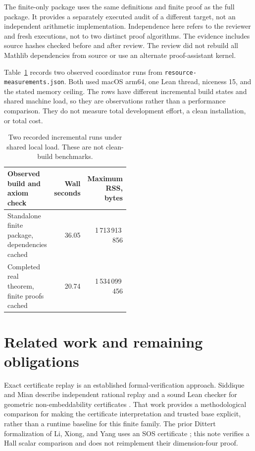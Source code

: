 \documentclass[11pt]{article}
\newcommand{\code}[1]{\texttt{\small #1}}
\begin{document}
The finite-only package uses the same definitions and finite proof as
the full package. It provides a separately executed audit of a different
target, not an independent arithmetic implementation. Independence here
refers to the reviewer and fresh executions, not to two distinct proof
algorithms. The evidence includes source hashes checked before and after
review. The review did not rebuild all Mathlib dependencies from source
or use an alternate proof-assistant kernel.

Table~\ref{tab:resources} records two observed coordinator runs from
\code{resource-measurements.json}. Both used macOS arm64, one Lean
thread, niceness 15, and the stated memory ceiling. The rows have
different incremental build states and shared machine load, so they
are observations rather than a performance comparison. They do not
measure total development effort, a clean installation, or total cost.

\begin{table}[ht]
\centering
\begin{tabular}{@{}p{0.49\linewidth}rr@{}}
\toprule
Observed build and axiom check & Wall seconds & Maximum RSS, bytes\\
\midrule
Standalone finite package, dependencies cached &36.05&1\,713\,913\,856\\
Completed real theorem, finite proofs cached &20.74&1\,534\,099\,456\\
\bottomrule
\end{tabular}
\caption{Two recorded incremental runs under shared local load.
These are not clean-build benchmarks.}\label{tab:resources}
\end{table}

\section{Related work and remaining obligations}

Exact certificate replay is an established formal-verification approach.
Siddique and Mian describe independent rational replay and a sound
Lean checker for geometric non-embeddability certificates
\cite{siddique2026machine}. That work provides a methodological
comparison for making the certificate interpretation and trusted base
explicit, rather than a runtime baseline for this finite family.
The prior Dittert formalization of Li, Xiong, and Yang uses an SOS
certificate \cite{li2026proof}; this note verifies a Hall scalar
comparison and does not reimplement their dimension-four proof.
\end{document}
